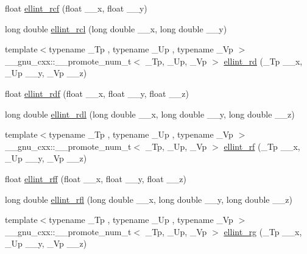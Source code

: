 \begin{DoxyCompactItemize}
\item 
float \hyperlink{namespace____gnu__cxx_aad5316092224ec3d92b66e79ef266adf}{ellint\+\_\+rcf} (float \+\_\+\+\_\+x, float \+\_\+\+\_\+y)
\item 
long double \hyperlink{namespace____gnu__cxx_a9b2f1cdeacd3615c702a77d995a0129c}{ellint\+\_\+rcl} (long double \+\_\+\+\_\+x, long double \+\_\+\+\_\+y)
\item 
{\footnotesize template$<$typename \+\_\+\+Tp , typename \+\_\+\+Up , typename \+\_\+\+Vp $>$ }\\\+\_\+\+\_\+gnu\+\_\+cxx\+::\+\_\+\+\_\+promote\+\_\+num\+\_\+t$<$ \+\_\+\+Tp, \+\_\+\+Up, \+\_\+\+Vp $>$ \hyperlink{namespace____gnu__cxx_a812c4f543575006c6b555d1385b88d90}{ellint\+\_\+rd} (\+\_\+\+Tp \+\_\+\+\_\+x, \+\_\+\+Up \+\_\+\+\_\+y, \+\_\+\+Vp \+\_\+\+\_\+z)
\item 
float \hyperlink{namespace____gnu__cxx_a52e7cc797b9d199b7468cdbec6505357}{ellint\+\_\+rdf} (float \+\_\+\+\_\+x, float \+\_\+\+\_\+y, float \+\_\+\+\_\+z)
\item 
long double \hyperlink{namespace____gnu__cxx_a68a38a5f320a7184cec4b120ddef6a65}{ellint\+\_\+rdl} (long double \+\_\+\+\_\+x, long double \+\_\+\+\_\+y, long double \+\_\+\+\_\+z)
\item 
{\footnotesize template$<$typename \+\_\+\+Tp , typename \+\_\+\+Up , typename \+\_\+\+Vp $>$ }\\\+\_\+\+\_\+gnu\+\_\+cxx\+::\+\_\+\+\_\+promote\+\_\+num\+\_\+t$<$ \+\_\+\+Tp, \+\_\+\+Up, \+\_\+\+Vp $>$ \hyperlink{namespace____gnu__cxx_ad276bd7533a87ca6d658cebc00a11b0a}{ellint\+\_\+rf} (\+\_\+\+Tp \+\_\+\+\_\+x, \+\_\+\+Up \+\_\+\+\_\+y, \+\_\+\+Vp \+\_\+\+\_\+z)
\item 
float \hyperlink{namespace____gnu__cxx_a39acf5c69a85f9b687478b32847156da}{ellint\+\_\+rff} (float \+\_\+\+\_\+x, float \+\_\+\+\_\+y, float \+\_\+\+\_\+z)
\item 
long double \hyperlink{namespace____gnu__cxx_a38dd36b3db5bbe5da516d0cbe3ff1f21}{ellint\+\_\+rfl} (long double \+\_\+\+\_\+x, long double \+\_\+\+\_\+y, long double \+\_\+\+\_\+z)
\item 
{\footnotesize template$<$typename \+\_\+\+Tp , typename \+\_\+\+Up , typename \+\_\+\+Vp $>$ }\\\+\_\+\+\_\+gnu\+\_\+cxx\+::\+\_\+\+\_\+promote\+\_\+num\+\_\+t$<$ \+\_\+\+Tp, \+\_\+\+Up, \+\_\+\+Vp $>$ \hyperlink{namespace____gnu__cxx_a9d3d53ace67dfa6126118fb780095a1f}{ellint\+\_\+rg} (\+\_\+\+Tp \+\_\+\+\_\+x, \+\_\+\+Up \+\_\+\+\_\+y, \+\_\+\+Vp \+\_\+\+\_\+z)
\item 

\end{DoxyCompactItemize}
